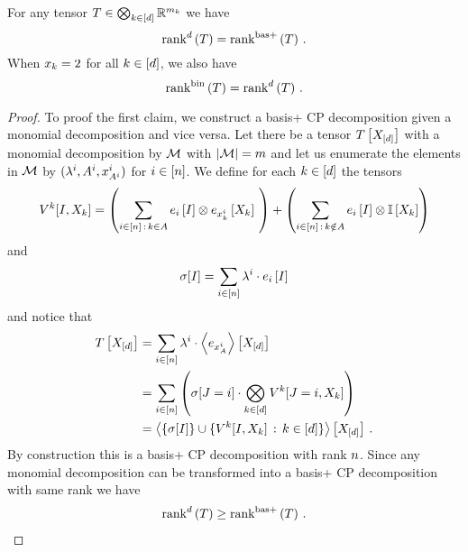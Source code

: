 \begin{theorem}
	For any tensor $T\in\bigotimes_{k\in[d]} \mathbb{R}^{m_{k}}$ we have
		\[ \mathrm{rank}^{d}\left(T\right) = \mathrm{rank}^{\mathrm{bas+}}\left(T\right) \, . \]
	When $x_{k}=2$ for all $k\in[d]$, we also have
		\[ \mathrm{rank}^{\mathrm{bin}}\left(T\right) = \mathrm{rank}^{d}\left(T\right)  \, . \]
\end{theorem}
\begin{proof}
	To proof the first claim, we construct a basis+ CP decomposition given a monomial decomposition and vice versa.
	Let there be a tensor $T\left[X_{[d]}\right]$ with a monomial decomposition by $\mathcal{M}$ with $\left|\mathcal{M}\right|=m$ and let us enumerate the elements in $\mathcal{M}$ by $(\lambda^{i}, A^{i}, x_{A^{i}}^{i})$ for $i\in[n]$.
	 We define for each $k\in[d]$ the tensors
	 \begin{align*}
		\legcoreofat{\atomenumerator}{\decvariable,\catvariableof{\atomenumerator}}
		 = \left( \sum_{\decindexin \, : \, \atomenumerator\in\variableset} \onehotmapofat{\decindex}{\decvariable} \otimes \onehotmapofat{\catindexof{\atomenumerator}^{\decindex}}{\catvariableof{\atomenumerator}} \right)
		 + \left(\sum_{\decindexin \, : \, \atomenumerator\notin\variableset} \onehotmapofat{\decindex}{\decvariable} \otimes \onesat{\catvariableof{\atomenumerator}} \right)
	\end{align*}
	and 
	\begin{align*}
		\sigma[I] = \sum_{i\in[n]} \lambda^{i} \cdot e_{i}\left[I\right]
	\end{align*}
	 and notice that	 
	\begin{align*}
		T\left[X_{[d]}\right] 
		& = \sum_{i\in[n]} \lambda^{i} \cdot \left\langle e_{x_{A}^{i}}\right\rangle \left[ X_{[d]} \right] \\
		& = \sum_{i\in[n]} \left(  \sigma[J=i] \cdot \bigotimes_{k\in[d]} V^{k}[J=i, X_{k}] \right) \\
		& = \left\langle 
		\{\sigma[I]\} \cup \{V^{k}[I,X_{k}] \, : \, k\in[d] \}
		\right\rangle \left[ X_{[d]} \right] \, . 
	\end{align*}
	By construction this is a basis+ CP decomposition with rank $n$.
	Since any monomial decomposition can be transformed into a basis+ CP decomposition with same rank we have
	\begin{align*}
		\mathrm{rank}^{d}\left(T\right) \geq \mathrm{rank}^{\mathrm{bas+}}\left(T\right) \, . 
	\end{align*}
	

\end{proof}
